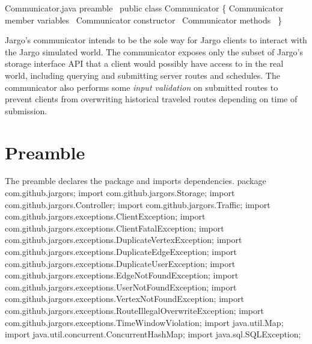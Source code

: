 \nwenddocs{}\endmoddef{}
\LA{}Communicator.java preamble~{\nwtagstyle{}}\RA{}
public class Communicator \{
  \LA{}\code{}Communicator\edoc{} member variables~{\nwtagstyle{}}\RA{}
  \LA{}\code{}Communicator\edoc{} constructor~{\nwtagstyle{}}\RA{}
  \LA{}\code{}Communicator\edoc{} methods~{\nwtagstyle{}}\RA{}
\}
\nwendcode{}\nwdocspar

Jargo's communicator intends to be the sole way for Jargo clients to interact
with the Jargo simulated world. The communicator exposes only the subset of
Jargo's storage interface API that a client would possibly have access to in
the real world, including querying and submitting server routes and schedules.
The communicator also performs some \emph{input validation} on submitted routes
to prevent clients from overwriting historical traveled routes depending on
time of submission.

\section{Preamble}
The preamble declares the package and imports dependencies.
\nwenddocs{}\endmoddef{}
package com.github.jargors;
\nwendcode{}\nwdocspar
\nwenddocs{}\plusendmoddef
import com.github.jargors.Storage;
import com.github.jargors.Controller;
import com.github.jargors.Traffic;
import com.github.jargors.exceptions.ClientException;
import com.github.jargors.exceptions.ClientFatalException;
import com.github.jargors.exceptions.DuplicateVertexException;
import com.github.jargors.exceptions.DuplicateEdgeException;
import com.github.jargors.exceptions.DuplicateUserException;
import com.github.jargors.exceptions.EdgeNotFoundException;
import com.github.jargors.exceptions.UserNotFoundException;
import com.github.jargors.exceptions.VertexNotFoundException;
import com.github.jargors.exceptions.RouteIllegalOverwriteException;
import com.github.jargors.exceptions.TimeWindowViolation;
import java.util.Map;
import java.util.concurrent.ConcurrentHashMap;
import java.sql.SQLException;
\nwendcode{}\nwdocspar

